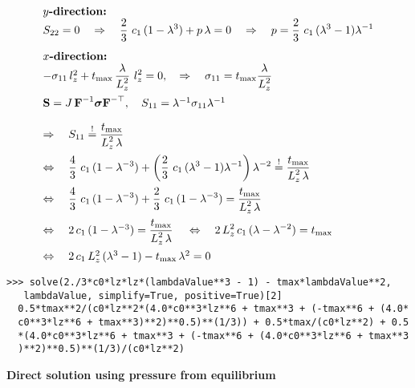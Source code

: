 \begin{equation*}
  \begin{array}{lll}
    \textbf{$y$-direction:}\\
    S_{22} = 0 \quad \Rightarrow \quad 
    \displaystyle\frac{\displaystyle{2}}{\displaystyle{3}}\,\,c_1\,(1-\lambda^3) + p\,\lambda = 0 \quad \Rightarrow \quad p =  \displaystyle\frac{\displaystyle{2}}{\displaystyle{3}}\,\,c_1\,(\lambda^3-1)\lambda^{-1}\\[4mm]
    
    \textbf{$x$-direction:}\\
    -\sigma_{11}\,l_z^2 + t_\text{max}\,\displaystyle\frac{\displaystyle{\lambda}}{\displaystyle{L_z^2}}\,\,l_z^2 = 0,\quad \Rightarrow \quad 
    \sigma_{11} = t_\text{max}\displaystyle\frac{\displaystyle{\lambda}}{\displaystyle{L_z^2}}\,\\[4mm]
    \textbf{S} = J\,\textbf{F}^{-1} \boldsymbol{\sigma} \textbf{F}^{-\top}, \quad 
    S_{11} = \lambda^{-1} \sigma_{11} \lambda^{-1}\\[4mm]
    \Rightarrow \quad S_{11} \overset{!}{=} \displaystyle\frac{\displaystyle{t_\text{max}}}{\displaystyle{L_z^2\,\lambda}}\,\\[4mm]
    \Leftrightarrow \quad   \displaystyle\frac{\displaystyle{4}}{\displaystyle{3}}\,\,c_1\,(1-\lambda^{-3}) + \left( \displaystyle\frac{\displaystyle{2}}{\displaystyle{3}}\,\,c_1\,(\lambda^3-1)\lambda^{-1} \right)\lambda^{-2} \overset{!}{=} \displaystyle\frac{\displaystyle{t_\text{max}}}{\displaystyle{L_z^2\,\lambda}}\,   \\[4mm]
    \Leftrightarrow \quad   \displaystyle\frac{\displaystyle{4}}{\displaystyle{3}}\,\,c_1\,(1-\lambda^{-3}) + \displaystyle\frac{\displaystyle{2}}{\displaystyle{3}}\,\,c_1\,(1-\lambda^{-3}) = \displaystyle\frac{\displaystyle{t_\text{max}}}{\displaystyle{L_z^2\,\lambda}}\,   \\[4mm]
    \Leftrightarrow \quad   2\,c_1\,(1-\lambda^{-3}) = \displaystyle\frac{\displaystyle{t_\text{max}}}{\displaystyle{L_z^2\,\lambda}}\, 
    \quad  \Leftrightarrow \quad   2\,L_z^2\,c_1\,(\lambda-\lambda^{-2}) = t_\text{max}   \\[4mm]
    \Leftrightarrow \quad   2\,c_1\,L_z^2\,(\lambda^3 - 1) - t_\text{max}\,\lambda^2 = 0
  \end{array}
\end{equation*}
\begin{lstlisting}[columns=fixed,basicstyle=\ttfamily]
  >>> solve(2./3*c0*lz*lz*(lambdaValue**3 - 1) - tmax*lambdaValue**2,
   lambdaValue, simplify=True, positive=True)[2]
  0.5*tmax**2/(c0*lz**2*(4.0*c0**3*lz**6 + tmax**3 + (-tmax**6 + (4.0*
  c0**3*lz**6 + tmax**3)**2)**0.5)**(1/3)) + 0.5*tmax/(c0*lz**2) + 0.5
  *(4.0*c0**3*lz**6 + tmax**3 + (-tmax**6 + (4.0*c0**3*lz**6 + tmax**3
  )**2)**0.5)**(1/3)/(c0*lz**2)
\end{lstlisting}

\textbf{Direct solution using pressure from equilibrium}

